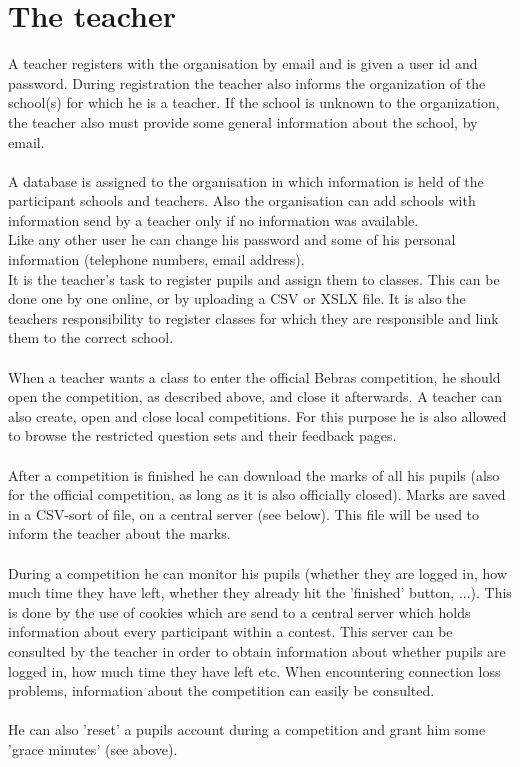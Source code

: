 \section{The teacher}

A teacher registers with the organisation by email and is given a user id and password. During
registration the teacher also informs the organization of the school(s) for which he is a teacher. If the school is unknown to the organization, the teacher also must provide some general information about the school, by email. \\
\\
A database is assigned to the organisation in which information is held of the participant schools and teachers. Also the organisation can add schools with information send by a teacher only if no information was available. \\
Like any other user he can change his password and some of his personal information (telephone numbers, email address).\\
It is the teacher's task to register pupils and assign them to classes. This can be done one by one online, or by uploading a CSV or XSLX file. It is also the teachers responsibility to register classes for which they are responsible and link them to the correct school.\\
\\
When a teacher wants a class to enter the official Bebras competition, he should open the competition, as described above, and close it afterwards. A teacher can also create, open and close local competitions. For this purpose he is also allowed to browse the restricted question sets and their feedback pages.\\
\\
After a competition is finished he can download the marks of all his pupils (also for the official competition, as long as it is also officially closed). Marks are saved in a CSV-sort of file, on a central server (see below). This file will be used to inform the teacher about the marks.\\
\\
During a competition he can monitor his pupils (whether they are logged in, how much time they have left, whether they already hit the 'finished' button, ...). This is done by the use of cookies which are send to a central server which holds information about every participant within a contest. This server can be consulted by the teacher in order to obtain information about whether pupils are logged in, how much time they have left etc. When encountering connection loss problems, information about the competition can easily be consulted.  \\
\\
He can also 'reset' a pupils account during a competition and grant him some 'grace minutes' (see above).